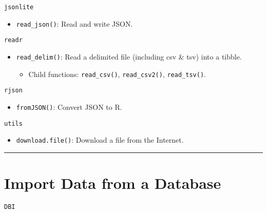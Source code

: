 \documentclass[]{book}
\providecommand{\tightlist}{%
  \setlength{\itemsep}{0pt}\setlength{\parskip}{0pt}}
\theoremstyle{definition}
\theoremstyle{definition}
\theoremstyle{definition}
\theoremstyle{remark}
\begin{document}
\texttt{jsonlite}

\begin{itemize}
\tightlist
\item
  \texttt{read\_json()}: Read and write JSON.
\end{itemize}

\texttt{readr}

\begin{itemize}
\tightlist
\item
  \texttt{read\_delim()}: Read a delimited file (including csv \& tsv)
  into a tibble.

  \begin{itemize}
  \tightlist
  \item
    Child functions: \texttt{read\_csv()}, \texttt{read\_csv2()},
    \texttt{read\_tsv()}.
  \end{itemize}
\end{itemize}

\texttt{rjson}

\begin{itemize}
\tightlist
\item
  \texttt{fromJSON()}: Convert JSON to R.
\end{itemize}

\texttt{utils}

\begin{itemize}
\tightlist
\item
  \texttt{download.file()}: Download a file from the Internet.
\end{itemize}

\begin{center}\rule{0.5\linewidth}{\linethickness}\end{center}

\section{Import Data from a Database}\label{import-data-from-a-database}

\texttt{DBI}
\end{document}
